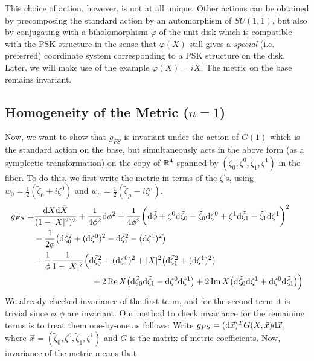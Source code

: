 This choice of action, however, is not at all unique. Other actions can be obtained by precomposing the standard action by an automorphism of $SU(1,1)$, but also by conjugating with a biholomorphism $\varphi$ of the unit disk which is compatible with the PSK structure in the sense that $\varphi(X)$ still gives a \emph{special} (i.e. preferred) coordinate system corresponding to a PSK structure on the disk. Later, we will make use of the example $\varphi(X)=iX$. The metric on the base remains invariant.

\subsection{Homogeneity of the Metric (\texorpdfstring{$n=1$}{n=1})}

Now, we want to show that $g_{FS}$ is invariant under the action of $G(1)$ which is the standard action on the base, but simultaneously acts in the above form (as a symplectic transformation) on the copy of $\mathbb{R}^4$ spanned by $(\tilde\zeta_0,\zeta^0,\tilde\zeta_1,\zeta^1)$ in the fiber. To do this, we first write the metric in terms of the $\zeta$'s, using $w_0=\frac{1}{2}(\tilde \zeta_0+i\zeta^0)$ and $w_\mu=\frac{1}{2}(\tilde\zeta_\mu-i\zeta^\mu)$.
\begin{align*}
	g_{FS}=&\frac{\mathrm{d} X \mathrm{d} \bar X}{(1-\lvert X \rvert^2)^2} + \frac{1}{4\phi^2}\mathrm{d} \phi^2
	+\frac{1}{4\phi^2}\bigg(\mathrm{d} \tilde{\phi}+\zeta^0 \mathrm{d} \tilde{\zeta}_0 -\tilde{\zeta}_0 \mathrm{d} \zeta^0
	+\zeta^1 \mathrm{d} \tilde{\zeta}_1 -\tilde{\zeta}_1 \mathrm{d} \zeta^1\bigg)^2\\
	&-\frac{1}{2\phi} \big(\mathrm{d} \tilde\zeta_0^2+ (\mathrm{d} \zeta^0)^2 - \mathrm{d} \tilde \zeta_1^2 - (\mathrm{d} \zeta^1)^2\big)\\
	&+\frac{1}{\phi}\frac{1}{1-\lvert X \rvert^2}\Big(\mathrm{d} \tilde\zeta_0^2+(\mathrm{d} \zeta^0)^2
	+ \lvert X \rvert^2\big(\mathrm{d} \tilde\zeta_1^2+(\mathrm{d} \zeta^1)^2\big)\\
	&\hspace{2.4cm}+2\operatorname{Re} X \big(\mathrm{d} \tilde\zeta_0\mathrm{d} \tilde\zeta_1 - \mathrm{d} \zeta^0 \mathrm{d} \zeta^1 \big) 
	+2\operatorname{Im} X \big(\mathrm{d} \tilde\zeta_0 \mathrm{d} \zeta^1 + \mathrm{d} \zeta^0\mathrm{d} \tilde\zeta_1 \big) \Big)
\end{align*}
We already checked invariance of the first term, and for the second term it is trivial since $\phi,\tilde\phi$ are invariant. Our method to check invariance for the remaining terms is to treat them one-by-one as follows: Write $g_{FS}=(\mathrm{d} \vec x)^T G(X,\vec x) \mathrm{d} \vec x$, where $\vec x=(\tilde\zeta_0,\zeta^0,\tilde\zeta_1,\zeta^1)$ and $G$ is the matrix of metric coefficients. Now, invariance of the metric means that
